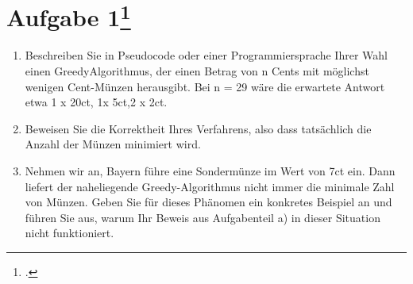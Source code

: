 \documentclass{lehramt-informatik-minimal}
\begin{document}
\section{Aufgabe 1\footcite[Thema 1 Aufgabe 1]{examen:66115:2007:03}}

\begin{enumerate}


\item Beschreiben Sie in Pseudocode oder einer Programmiersprache Ihrer
Wahl einen GreedyAlgorithmus, der einen Betrag von n Cents mit möglichst
wenigen Cent-Münzen herausgibt. Bei n = 29 wäre die erwartete Antwort
etwa 1 x 20ct, 1x 5ct,2 x 2ct.


\item Beweisen Sie die Korrektheit Ihres Verfahrens, also dass
tatsächlich die Anzahl der Münzen minimiert wird.


\item Nehmen wir an, Bayern führe eine Sondermünze im Wert von 7ct ein.
Dann liefert der naheliegende Greedy-Algorithmus nicht immer die
minimale Zahl von Münzen. Geben Sie für dieses Phänomen ein konkretes
Beispiel an und führen Sie aus, warum Ihr Beweis aus Aufgabenteil a) in
dieser Situation nicht funktioniert.
\end{enumerate}
\end{document}
